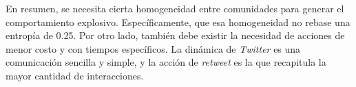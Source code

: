 \documentclass[../main.tex]{subfiles}
\begin{document}
En resumen, se necesita cierta homogeneidad entre comunidades para generar el comportamiento explosivo. Específicamente, que esa homogeneidad no rebase una entropía de 0.25. Por otro lado, también debe existir la necesidad de acciones de menor costo y con tiempos específicos. La dinámica de \textit{Twitter} es una comunicación sencilla y simple, y la acción de \textit{retweet} es la que recapitula la mayor cantidad de interacciones.   




















    
\end{document}
